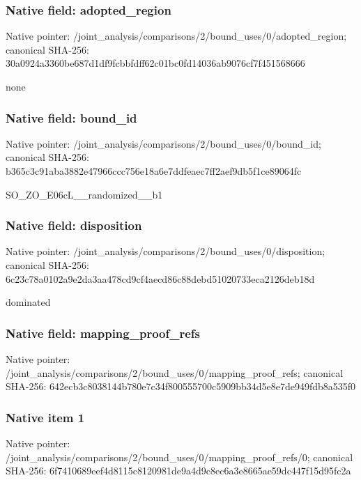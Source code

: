 \documentclass[10pt,a4paper]{article}
\begin{document}
\subsubsection{Native field: adopted\_region}


Native pointer: /joint\_analysis/comparis\allowbreak{}ons/2/bound\_uses/0/adopt\allowbreak{}ed\_region; canonical SHA-256: 30a0924a3360be687d1df9fc\allowbreak{}bbfdff62c01bc0fd14036ab9\allowbreak{}076cf7f451568666


none


\subsubsection{Native field: bound\_id}


Native pointer: /joint\_analysis/comparis\allowbreak{}ons/2/bound\_uses/0/bound\allowbreak{}\_id; canonical SHA-256: b365c3c91aba3882e47966cc\allowbreak{}c756e18a6e7ddfeaec7ff2ae\allowbreak{}f9db5f1ce89064fc


SO\_ZO\_E06cL\_\_randomized\_\_b1


\subsubsection{Native field: disposition}


Native pointer: /joint\_analysis/comparis\allowbreak{}ons/2/bound\_uses/0/dispo\allowbreak{}sition; canonical SHA-256: 6c23c78a0102a9e2da3aa478\allowbreak{}cd9cf4aecd86c88debd51020\allowbreak{}733eca2126deb18d


dominated


\subsubsection{Native field: mapping\_proof\_refs}


Native pointer: /joint\_analysis/comparis\allowbreak{}ons/2/bound\_uses/0/mappi\allowbreak{}ng\_proof\_refs; canonical SHA-256: 642ecb3c8038144b780e7c34\allowbreak{}f800555700c5909bb34d5e8e\allowbreak{}7de949fdb8a535f0



\subsubsection{Native item 1}


Native pointer: /joint\_analysis/comparis\allowbreak{}ons/2/bound\_uses/0/mappi\allowbreak{}ng\_proof\_refs/0; canonical SHA-256: 6f7410689eef4d8115c81209\allowbreak{}81de9a4d9c8ec6a3e8665ae5\allowbreak{}9dc447f15d95fc2a
\end{document}

